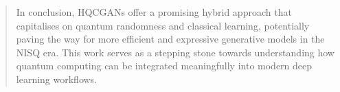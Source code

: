 \begin{abstract}
In conclusion, HQCGANs offer a promising hybrid approach that capitalises on quantum randomness and classical learning, potentially paving the way for more efficient and expressive generative models in the NISQ era. This work serves as a stepping stone towards understanding how quantum computing can be integrated meaningfully into modern deep learning workflows.
\end{abstract}
